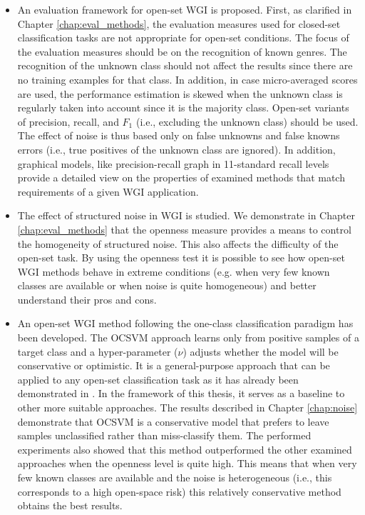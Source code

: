 \begin{itemize}
    \item An evaluation framework for open-set WGI is proposed. First, as clarified in Chapter \ref{chap:eval_methods}, the evaluation measures used for closed-set classification tasks are not appropriate for open-set conditions. The focus of the evaluation measures should be on the recognition of known genres. The recognition of the unknown class should not affect the results since there are no training examples for that class. In addition, in case micro-averaged scores are used, the performance estimation is skewed when the unknown class is regularly taken into account since it is the majority class. Open-set variants of precision, recall, and $F_1$ (i.e., excluding the unknown class) should be used. The effect of noise is thus based only on false unknowns and false knowns errors (i.e., true positives of the unknown class are ignored). In addition, graphical models, like precision-recall graph in 11-standard recall levels provide a detailed view on the properties of examined methods that match requirements of a given WGI application. 
    \item The effect of structured noise in WGI is studied. We demonstrate in Chapter \ref{chap:eval_methods} that the openness measure provides a means to control the homogeneity of structured noise. This also affects the difficulty of the open-set task. By using the openness test it is possible to see how open-set WGI methods behave in extreme conditions (e.g. when very few known classes are available or when noise is quite homogeneous) and better understand their pros and cons.
    \item An open-set WGI method following the one-class classification paradigm has been developed. The OCSVM approach learns only from positive samples of a target class and a hyper-parameter ($\nu$) adjusts whether the model will be conservative or optimistic. It is a general-purpose approach that can be applied to any open-set classification task as it has already been demonstrated in . In the framework of this thesis, it serves as a baseline to other more suitable approaches. The results described in Chapter \ref{chap:noise} demonstrate that OCSVM is a conservative model that prefers to leave samples unclassified rather than miss-classify them. The performed experiments also showed that this method outperformed the other examined approaches when the openness level is quite high. This means that when very few known classes are available and the noise is heterogeneous (i.e., this corresponds to a high open-space risk) this relatively conservative method obtains the best results.

\end{itemize}
